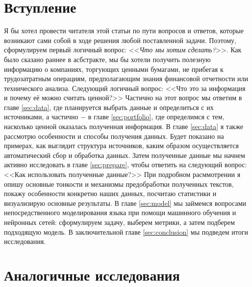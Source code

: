 \documentclass{article}
\begin{document}
\section*{Вступление}
Я бы хотел провести читателя этой статьи по пути вопросов и ответов, которые возникают сами собой в ходе решения любой поставленной задачи. Поэтому, сформулируем первый логичный вопрос: 
<<\emph{Что мы хотим сделать?}>>. Как было сказано раннее в асбстракте, мы бы хотели получить полезную информацию о компаниях, торгующих ценными бумагами, не прибегая к трудозатратным операциям, предполагающим знания финансовой отчетности или технического анализа. Следующий логичный вопрос: <<Что это за информация и почему её можно считать ценной?>> Частично на этот вопрос мы ответим в главе \ref{sec:data}, где планируется выбрать данные и определиться с их источниками, а частично $-$ в главе \ref{sec:portfolio}, где определимся с тем, насколько ценной оказалась полученная информация. В главе  \ref{sec:data} я также рассмотрю особенности и способы получения данных. Будет показано на примерах, как выглядит структура источников, каким образом осуществляется автоматический сбор и обработка данных. Затем полученные данные мы начнем активно исследовать в главе  \ref{sec:prepare}, чтобы ответить на следующий вопрос: <<Как использовать полученные данные?>> При подробном расммотрении я опишу основные тонкости и механизмы предобработки полученных текстов, покажу особенности конкретно наших данных, посчитаю статистики и визуализирую основные результаты. В главе \ref{sec:model} мы займемся вопросами непосредственного моделирования языка при помощи машинного обучения и нейронных сетей: сформулируем задачу, выберем метрики, а затем подберем подходящую модель. В заключительной главе \ref{sec:conclusion} мы подведем итоги исследования.

\section{Аналогичные исследования}
\end{document}

